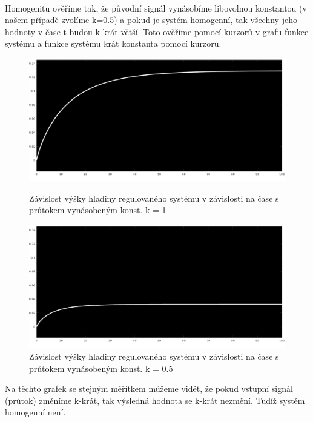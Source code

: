 \documentclass{article}
\begin{document}
	   	\paragraph{}
	   		Homogenitu ověříme tak, že původní signál vynásobíme libovolnou konstantou (v našem případě zvolíme k=0.5) a pokud je systém homogenní, tak všechny jeho hodnoty v čase t budou k-krát větší. Toto ověříme pomocí kurzorů v grafu funkce systému a funkce systému krát konstanta pomocí kurzorů.
	   		\begin{figure}[H]
	   		 \begin{minipage}[b]{.45\textwidth}
    \centering
    \includegraphics[width=\linewidth]{ukol1k1}
    \caption{Závislost výšky hladiny regulovaného systému v závislosti na čase s průtokem vynásobeným konst. k = 1}
  \end{minipage}\hfill
  \begin{minipage}[b]{.45\textwidth}
    \centering
    \includegraphics[width=\linewidth]{ukol1k05}
    \caption{Závislost výšky hladiny regulovaného systému v závislosti na čase s průtokem vynásobeným konst. k = 0.5}
  \end{minipage}
	   		\end{figure}
	   		
	   		\indent Na těchto grafek se stejným měřítkem můžeme vidět, že pokud vstupní signál (průtok) změníme k-krát, tak výsledná hodnota se k-krát nezmění. Tudíž systém homogenní není.
	   		
\end{document}
